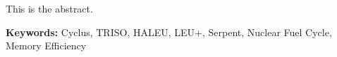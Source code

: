This is the abstract.



\textbf{Keywords:} Cyclus, TRISO, HALEU, LEU+, Serpent, Nuclear Fuel Cycle, Memory Efficiency